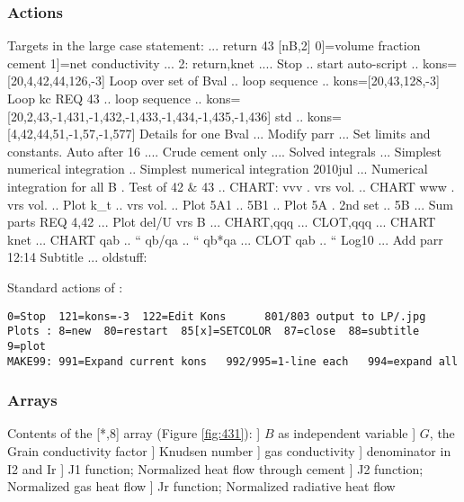 \documentclass{article}
\begin{document}
\subsubsection{Actions} %
Targets in the large case statement:
\qi {}... return 43 [nB,2] 0]=volume fraction cement  1]=net conductivity
\qi {}... 2: return,knet
\qi {}.... Stop
\qi {}.. start auto-script 
\qi {}.. kons=[20,4,42,44,126,-3] Loop over set of Bval
\qi {}.. loop sequence
\qi {}.. kons=[20,43,128,-3] Loop kc  REQ 43 
\qi {}.. loop sequence
\qi {}.. kons=[20,2,43,-1,431,-1,432,-1,433,-1,434,-1,435,-1,436] std
\qi {}.. kons=[4,42,44,51,-1,57,-1,577] Details for one Bval
\qi {}... Modify parr
\qi {}... Set limits and constants. Auto after 16
\qi {}.... Crude cement only
\qi {}.... Solved integrals 
\qi {}... Simplest numerical integration
\qi {}.. Simplest numerical integration 2010jul
\qi {}... Numerical integration for all B
\qi {}. Test of 42 \& 43
\qi {}.. CHART: vvv
\qi {}. vrs vol.
\qi {}.. CHART www
\qi {}. vrs vol.
\qi {}.. Plot k\_t
\qi {}.. vrs vol.
\qi {}.. Plot 5A1
\qi {}.. 5B1
\qi {}.. Plot 5A
\qi {}. 2nd set
\qi {}.. 5B
\qi {}... Sum parts REQ 4,42
\qi {}... Plot del/U vrs B
\qi {}... CHART,qqq
\qi {}... CLOT,qqq
\qi {}... CHART knet
\qi {}... CHART qab
\qi {}.. `` qb/qa
\qi {}.. `` qb*qa
\qi {}... CLOT qab
\qi {}..  `` Log10
\qi {}... Add parr 12:14 Subtitle 
\qi {}... oldstuff:

Standard actions of : \begin{verbatim}
0=Stop  121=kons=-3  122=Edit Kons      801/803 output to LP/.jpg
Plots : 8=new  80=restart  85[x]=SETCOLOR  87=close  88=subtitle  9=plot
MAKE99: 991=Expand current kons   992/995=1-line each   994=expand all \end{verbatim}
\subsubsection{Arrays} %

Contents of the  [*,8] array (Figure \ref{fig:431}): 
] $B$ as independent variable
] $G$, the Grain conductivity factor
] Knudsen number
] gas conductivity 
] denominator in I2 and Ir
] J1 function; Normalized heat flow through cement
] J2 function; Normalized gas heat flow
] Jr function; Normalized radiative heat flow
\end{document}
